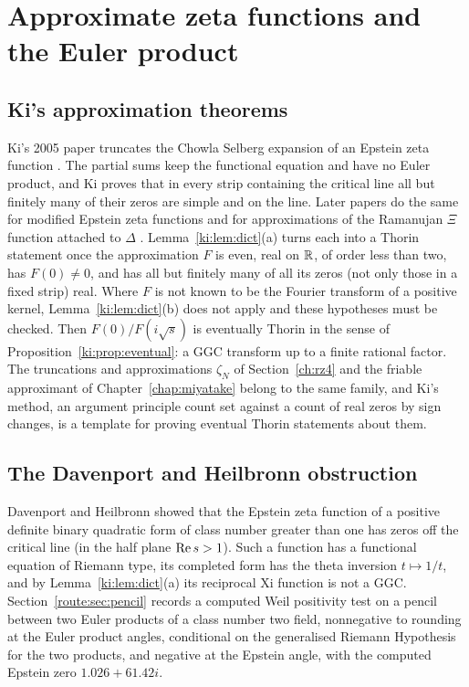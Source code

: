 \section{Approximate zeta functions and the Euler product}\label{ki:sec:approx}

\subsection{Ki's approximation theorems}

Ki's 2005 paper truncates the Chowla Selberg expansion of an Epstein zeta function \cite{Ki05}. The partial sums keep the functional equation and have no Euler product, and Ki proves that in every strip containing the critical line all but finitely many of their zeros are simple and on the line. Later papers do the same for modified Epstein zeta functions \cite{Ki06a} and for approximations of the Ramanujan $\Xi$ function attached to $\Delta$ \cite{Ki08a}. %
Lemma~\ref{ki:lem:dict}(a) turns each into a Thorin statement once the approximation $F$ is even, real on $\mathbb{R}$, of order less than two, has $F(0)\ne0$, and has all but finitely many of all its zeros (not only those in a fixed strip) real. Where $F$ is not known to be the Fourier transform of a positive kernel, Lemma~\ref{ki:lem:dict}(b) does not apply and these hypotheses must be checked. Then $F(0)/F(i\sqrt s)$ is eventually Thorin in the sense of Proposition~\ref{ki:prop:eventual}: a GGC transform up to a finite rational factor. The truncations and approximations $\zeta_N$ of Section~\ref{ch:rz4} and the friable approximant of Chapter~\ref{chap:miyatake} belong to the same family, and Ki's method, an argument principle count set against a count of real zeros by sign changes, is a template for proving eventual Thorin statements about them. %

\subsection{The Davenport and Heilbronn obstruction}

Davenport and Heilbronn \cite{DH36} showed that the Epstein zeta function of a positive definite binary quadratic form of class number greater than one has zeros off the critical line (in the half plane $\operatorname{Re} s>1$). Such a function has a functional equation of Riemann type, its completed form has the theta inversion $t\mapsto1/t$, and by Lemma~\ref{ki:lem:dict}(a) its reciprocal Xi function is not a GGC. Section~\ref{route:sec:pencil} records a computed Weil positivity test on a pencil between two Euler products of a class number two field, nonnegative to rounding at the Euler product angles, conditional on the generalised Riemann Hypothesis for the two products, and negative at the Epstein angle, with the computed Epstein zero $1.026+61.42i$.

